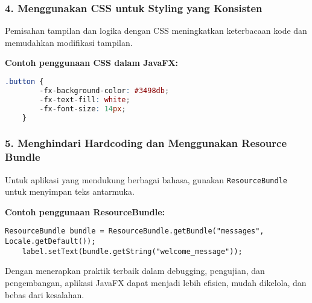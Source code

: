 \subsubsection{4. Menggunakan CSS untuk Styling yang Konsisten}

Pemisahan tampilan dan logika dengan CSS meningkatkan keterbacaan kode dan memudahkan modifikasi tampilan.

\textbf{Contoh penggunaan CSS dalam JavaFX:}
\begin{lstlisting}[language=css, caption=Custom styling untuk tombol dalam JavaFX]
	.button {
		-fx-background-color: #3498db;
		-fx-text-fill: white;
		-fx-font-size: 14px;
	}
\end{lstlisting}

\subsubsection{5. Menghindari Hardcoding dan Menggunakan Resource Bundle}

Untuk aplikasi yang mendukung berbagai bahasa, gunakan \texttt{ResourceBundle} untuk menyimpan teks antarmuka.

\textbf{Contoh penggunaan ResourceBundle:}
\begin{lstlisting}[style=JavaStyle, caption=Memuat teks dari ResourceBundle]
	ResourceBundle bundle = ResourceBundle.getBundle("messages", Locale.getDefault());
	label.setText(bundle.getString("welcome_message"));
\end{lstlisting}

Dengan menerapkan praktik terbaik dalam debugging, pengujian, dan pengembangan, aplikasi JavaFX dapat menjadi lebih efisien, mudah dikelola, dan bebas dari kesalahan.

